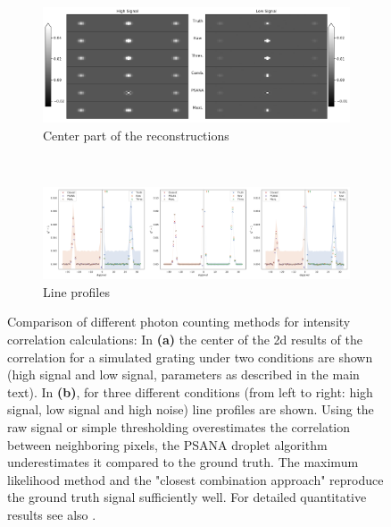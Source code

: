 \begin{figure}
	\centering
	\begin{subfigure}[b]{0.85\textwidth}
		\includegraphics[width=\linewidth]{images/photonreconimg.pdf}	
		\caption{Center part of the reconstructions}
		\label{fig:photonreconimg}
	\end{subfigure}
	\\
	\begin{subfigure}[b]{0.95\textwidth}
		\includegraphics[width=\linewidth]{images/photonrecon.pdf}
		\caption{Line profiles}
		\label{fig:photonrecon}
	\end{subfigure}	
	
	\caption[Comparison of different photon counting methods for intensity correlation calculations]{Comparison of different photon counting methods for intensity correlation calculations: In \textbf{(a)} the center of the 2d results of the correlation for a simulated grating under two conditions are shown (high signal and low signal, parameters as described in the main text). In  \textbf{(b)}, for three different conditions (from left to right: high signal, low signal and high noise) line profiles are shown. Using the raw signal or simple thresholding overestimates the correlation between neighboring pixels, the PSANA droplet algorithm underestimates it compared to the ground truth. The maximum likelihood method and the "closest combination approach" reproduce the ground truth signal sufficiently well. For detailed quantitative results see also .}
\end{figure}
